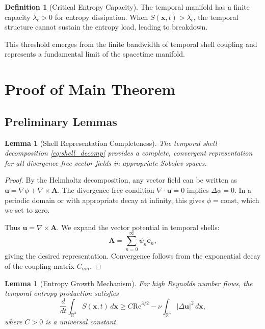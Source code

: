 \documentclass[11pt,a4paper]{article}
\newtheorem{lemma}[theorem]{Lemma}
\theoremstyle{definition}
\newtheorem{definition}[theorem]{Definition}
\newcommand{\R}{\mathbb{R}}
\newcommand{\grad}{\nabla}
\newcommand{\dive}{\nabla \cdot}
\newcommand{\curl}{\nabla \times}
\newcommand{\lapl}{\Delta}
\newcommand{\la}{\lambda}
\begin{document}
\begin{definition}[Critical Entropy Capacity]
The temporal manifold has a finite capacity $\la_c > 0$ for entropy dissipation. When $S(\mathbf{x}, t) > \la_c$, the temporal structure cannot sustain the entropy load, leading to breakdown.
\end{definition}

This threshold emerges from the finite bandwidth of temporal shell coupling and represents a fundamental limit of the spacetime manifold.

\section{Proof of Main Theorem}

\subsection{Preliminary Lemmas}

\begin{lemma}[Shell Representation Completeness]\label{lem:completeness}
The temporal shell decomposition \eqref{eq:shell_decomp} provides a complete, convergent representation for all divergence-free vector fields in appropriate Sobolev spaces.
\end{lemma}

\begin{proof}
By the Helmholtz decomposition, any vector field can be written as $\mathbf{u} = \grad \phi + \curl \mathbf{A}$. The divergence-free condition $\dive \mathbf{u} = 0$ implies $\lapl \phi = 0$. In a periodic domain or with appropriate decay at infinity, this gives $\phi = \text{const}$, which we set to zero.

Thus $\mathbf{u} = \curl \mathbf{A}$. We expand the vector potential in temporal shells:
\begin{equation}
\mathbf{A} = \sum_{n=0}^\infty \psi_n \mathbf{e}_n,
\end{equation}
giving the desired representation. Convergence follows from the exponential decay of the coupling matrix $C_{nm}$.
\end{proof}

\begin{lemma}[Entropy Growth Mechanism]\label{lem:entropy_growth}
For high Reynolds number flows, the temporal entropy production satisfies
\begin{equation}
\frac{d}{dt}\int_{\R^3} S(\mathbf{x}, t) \, d\mathbf{x} \geq C \text{Re}^{3/2} - \nu \int_{\R^3} |\lapl \mathbf{u}|^2 \, d\mathbf{x},
\end{equation}
where $C > 0$ is a universal constant.
\end{lemma}
\end{document}
